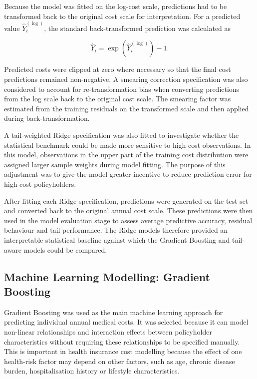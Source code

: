\documentclass[11pt]{article}
\begin{document}
	Because the model was fitted on the log-cost scale, predictions had to be transformed back to the original cost scale for interpretation. For a predicted value \(\hat{Y}_i^{(\log)}\), the standard back-transformed prediction was calculated as
	
	\begin{equation}
		\hat{Y}_i = \exp\left(\hat{Y}_i^{(\log)}\right) - 1.
	\end{equation}
	
	Predicted costs were clipped at zero where necessary so that the final cost predictions remained non-negative. A smearing correction specification was also considered to account for re-transformation bias when converting predictions from the log scale back to the original cost scale. The smearing factor was estimated from the training residuals on the transformed scale and then applied during back-transformation.
	
	A tail-weighted Ridge specification was also fitted to investigate whether the statistical benchmark could be made more sensitive to high-cost observations. In this model, observations in the upper part of the training cost distribution were assigned larger sample weights during model fitting. The purpose of this adjustment was to give the model greater incentive to reduce prediction error for high-cost policyholders.
	
	After fitting each Ridge specification, predictions were generated on the test set and converted back to the original annual cost scale. These predictions were then used in the model evaluation stage to assess average predictive accuracy, residual behaviour and tail performance. The Ridge models therefore provided an interpretable statistical baseline against which the Gradient Boosting and tail-aware models could be compared.

	\subsection{Machine Learning Modelling: Gradient Boosting}
	
	Gradient Boosting was used as the main machine learning approach for predicting individual annual medical costs. It was selected because it can model non-linear relationships and interaction effects between policyholder characteristics without requiring these relationships to be specified manually. This is important in health insurance cost modelling because the effect of one health-risk factor may depend on other factors, such as age, chronic disease burden, hospitalisation history or lifestyle characteristics.
	
\end{document}
